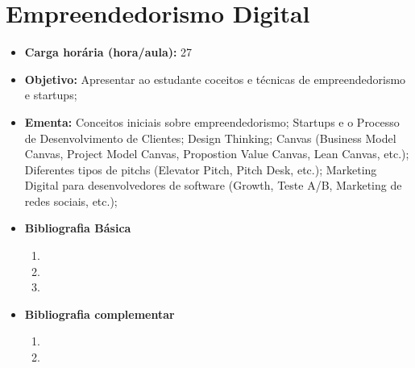 \documentclass[11pt,fleqn]{book} %
\begin{document}
\section{Empreendedorismo Digital}\label{6_empdig}
\begin{itemize}
	\item \textbf{Carga horária (hora/aula):} 27
	\item \textbf{Objetivo:} Apresentar ao estudante coceitos e técnicas de empreendedorismo e startups;
	\item \textbf{Ementa:} 
	Conceitos iniciais sobre empreendedorismo;
	Startups e o Processo de Desenvolvimento de Clientes;
	Design Thinking;
	Canvas (Business Model Canvas, Project Model Canvas, Propostion Value Canvas, Lean Canvas, etc.);
    Diferentes tipos de pitchs (Elevator Pitch, Pitch Desk, etc.);
    Marketing Digital para desenvolvedores de software (Growth, Teste A/B, Marketing de redes sociais, etc.);
    
	\item \textbf{Bibliografia Básica}
	\begin{enumerate}
		\item 
		\item 
		\item 
	\end{enumerate}
	\item \textbf{Bibliografia complementar}
	\begin{enumerate}
		\item 
		\item
	\end{enumerate} 	
\end{itemize}


\newpage
\end{document}
